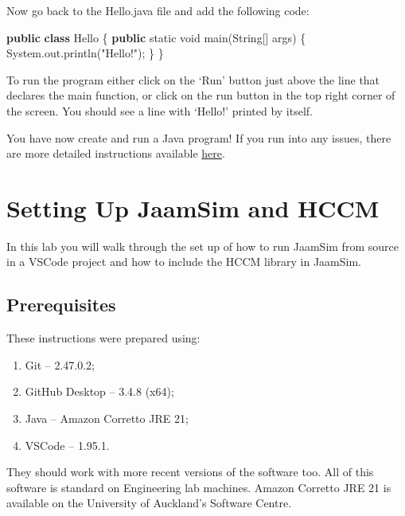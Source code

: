 \documentclass[
  10pt,
  a4paperpaper,
  DIV=11,
  numbers=noendperiod,
  oneside]{scrreprt}
\newenvironment{Shaded}{\begin{snugshade}}{\end{snugshade}}
\newcommand{\BuiltInTok}[1]{\textcolor[rgb]{0.00,0.23,0.31}{#1}}
\newcommand{\DataTypeTok}[1]{\textcolor[rgb]{0.68,0.00,0.00}{#1}}
\newcommand{\FunctionTok}[1]{\textcolor[rgb]{0.28,0.35,0.67}{#1}}
\newcommand{\KeywordTok}[1]{\textcolor[rgb]{0.00,0.23,0.31}{\textbf{#1}}}
\newcommand{\NormalTok}[1]{\textcolor[rgb]{0.00,0.23,0.31}{#1}}
\newcommand{\OperatorTok}[1]{\textcolor[rgb]{0.37,0.37,0.37}{#1}}
\newcommand{\StringTok}[1]{\textcolor[rgb]{0.13,0.47,0.30}{#1}}
\providecommand{\tightlist}{%
  \setlength{\itemsep}{0pt}\setlength{\parskip}{0pt}}\usepackage{longtable,booktabs,array}
\begin{document}
Now go back to the Hello.java file and add the following code:

\begin{Shaded}
\begin{Highlighting}[numbers=left,,]
\KeywordTok{public} \KeywordTok{class}\NormalTok{ Hello }\OperatorTok{\{}
  \KeywordTok{public} \DataTypeTok{static} \DataTypeTok{void} \FunctionTok{main}\OperatorTok{(}\BuiltInTok{String}\OperatorTok{[]}\NormalTok{ args}\OperatorTok{)} \OperatorTok{\{}
    \BuiltInTok{System}\OperatorTok{.}\FunctionTok{out}\OperatorTok{.}\FunctionTok{println}\OperatorTok{(}\StringTok{"Hello!"}\OperatorTok{);}
  \OperatorTok{\}}
\OperatorTok{\}}
\end{Highlighting}
\end{Shaded}

To run the program either click on the `Run' button just above the line
that declares the main function, or click on the run button in the top
right corner of the screen. You should see a line with `Hello!' printed
by itself.

You have now create and run a Java program! If you run into any issues,
there are more detailed instructions available
\href{https://code.visualstudio.com/docs/java/java-tutorial}{here}.

\chapter{Setting Up JaamSim and HCCM}\label{setting-up-jaamsim-and-hccm}

In this lab you will walk through the set up of how to run JaamSim from
source in a VSCode project and how to include the HCCM library in
JaamSim.

\section{Prerequisites}\label{prerequisites}

These instructions were prepared using:

\begin{enumerate}
\def\labelenumi{\arabic{enumi}.}
\tightlist
\item
  Git -- 2.47.0.2;
\item
  GitHub Desktop -- 3.4.8 (x64);
\item
  Java -- Amazon Corretto JRE 21;
\item
  VSCode -- 1.95.1.
\end{enumerate}

They should work with more recent versions of the software too. All of
this software is standard on Engineering lab machines. Amazon Corretto
JRE 21 is available on the University of Auckland's Software Centre.
\end{document}
